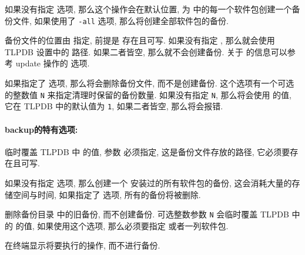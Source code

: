 如果没有指定  选项, 那么这个操作会在默认位置, 为  中的每一个软件包创建一个备份文件, 如果使用了 \texttt{-all} 选项, 那么将创建全部软件包的备份. 

备份文件的位置由   指定, 前提是  存在且可写. 如果没有指定 , 那么就会使用 TLPDB 设置中的  路径. 如果二者皆空, 那么就不会创建备份. 关于  的信息可以参考 \ac{update} 操作的 \hyperlink{op:backup}{} 选项. 

如果指定了  选项, 那么将会删除备份文件, 而不是创建备份. 这个选项有一个可选的整数值 \texttt{N} 来指定清理时保留的备份数量. 如果没有指定 \texttt{N}, 那么将会使用  的值, 它在 TLPDB 中的默认值为 \texttt{1}, 如果二者皆空, 那么将会报错. 

\paragraph{\textmd{\ac{backup}}的特有选项:}
\begin{description}
    \item {} \par
    临时覆盖 TLPDB 中  的值, 参数  必须指定, 这是备份文件存放的路径, 它必须要存在且可写. 
    \item {}\par
    如果没有指定  选项, 那么创建一个 \tl 安装过的所有软件包的备份, 这会消耗大量的存储空间与时间, 如果指定了  选项, 所有的备份将被删除. 
    \item {}\par
    删除备份目录  中的旧备份, 而不创建备份. 可选整数参数 \texttt{N} 会临时覆盖 TLPDB 中的  的值, 如果使用这个选项, 那么必须要指定  或者一列软件包. 
    \item {}\par
    在终端显示将要执行的操作, 而不进行备份. 
\end{description} 

